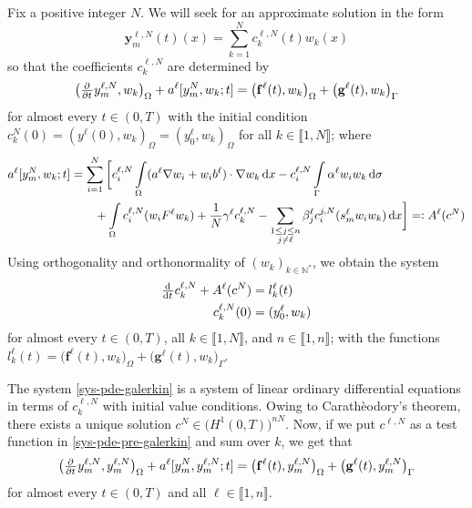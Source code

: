 \documentclass[11pt]{article}
\newcommand{\N}{\mathbb{N}}
\newcommand{\llb}{\llbracket}
\newcommand{\rrb}{\rrbracket}
\numberwithin{equation}{section}
\begin{document}
	Fix a positive integer \(N\). We will seek for an approximate solution in the form
	\begin{equation}
	\label{eq:ansatz}
		\mathbf{y}_m^{\ell,N} (t)(x) = \sum_{k=1}^N c_k^{\ell,N} (t) w_k(x)
	\end{equation}
	so that the coefficients \( c_k^{\ell,N} \) are determined by
	\begin{equation}
	\label{sys-pde-pre-galerkin}
		\big(\pd{ }{t}  y_m^{\ell,N}, w_k\big)_\Omega + 
		a^\ell [y_m^{N}, w_k; t] 
		=
		\big( \mathbf{f}^\ell (t), w_k \big)_{\Omega} + \big(\mathbf{g}^\ell (t),  w_k \big)_{\Gamma}
	\end{equation}
	for almost every \(t\in (0,T)\) with the initial condition \( c_k^N (0) =  ( y^\ell (0), w_k)_\Omega = (y_0^\ell, w_k)_\Omega\)  for all \(k \in \llb 1,N\rrb\); where
	\begin{align*}
		a^\ell [y_m^{N}, w_k; t] 
		&= 
		\sum_{i=1}^N  \bigg[ c_i^{\ell,N}  \int\limits_\Omega  ( a^\ell \nabla w_i + w_i b^\ell) \cdot \nabla w_k \dif x -  c_i^{\ell, N} \int\limits_\Gamma \alpha^\ell w_i w_k \dif \sigma
		\\
		&\qquad
		+ \int\limits_\Omega 
		c_i^{\ell,N} (w_i F^\ell w_k) + \frac{1}{N}  \gamma^\ell c_k^{\ell,N} -  \sum_{\substack{1\le j\le n\\ j\neq \ell}} \beta_j^\ell c_i^{j,N} (s_{m}^\ell w_i w_k)
		 \dif x
		\bigg] =: A^\ell (c^{N})
	\end{align*}
	Using orthogonality and orthonormality of \((w_k)_{k\in \N^*}\), we obtain the system
	\begin{subequations}
	\label{sys-pde-galerkin}
	\begin{align}
		\od{ }{t} c_k^{\ell,N} + A^\ell (c^{N}) &= l_k^\ell (t)		\\
		c_k^{\ell,N} (0) &= (y_0^\ell, w_k)
	\end{align}
	\end{subequations}
	for almost every \(t\in (0,T)\), all \( k\in \llb1,N\rrb\), and \(n\in \llb 1,n\rrb\); with the functions \( l^\ell_k(t) = \big( \mathbf{f}^\ell (t), w_k \big)_{\Omega} + \big(\mathbf{g}^\ell (t),  w_k \big)_{\Gamma}\).
	
	The system \eqref{sys-pde-galerkin} is a system of linear ordinary differential equations in terms of \(c_k^{\ell,N}\) with initial value conditions. Owing to Carathèodory's theorem, there exists a unique solution \( c^N \in \big(H^1(0,T)\big)^{nN}\). Now, if we put \(c^{\ell,N}\) as a test function in \eqref{sys-pde-pre-galerkin} and sum over \(k\), we get that
	\begin{equation}
	\label{eq:result-galerkin}
		\big(\pd{ }{t}  y_m^{\ell,N},  y_m^{\ell,N}\big)_\Omega + 
		a^\ell [ y_m^{N},  y_m^{\ell,N}; t] 
		=
		\big( \mathbf{f}^\ell (t),  y_m^{\ell,N} \big)_{\Omega} + \big(\mathbf{g}^\ell (t),   y_m^{\ell,N} \big)_{\Gamma}
	\end{equation}
	for almost every \(t\in (0,T)\) and all \(\ell \in \llb 1,n\rrb\). 
	
\end{document}
